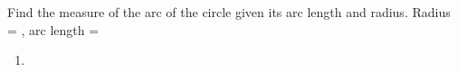 Find the measure of the arc of the circle given its arc length and radius.
\newline
Radius = , arc length = 
\newline
\begin{enumerate}
    \item
    \degree
{}
\end{enumerate}

